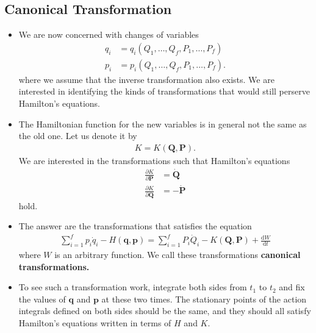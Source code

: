 \documentclass[10pt]{article}
\newcommand{\dee}{\mathrm{d}}
\newcommand{\ve}[1]{\mathbf{#1}}
\begin{document}
  \subsection{Canonical Transformation}

  \begin{itemize}
    \item We are now concerned with changes of variables
    \begin{align*}
      q_i &= q_i(Q_1, \dotsc, Q_f, P_1, \dotsc, P_f) \\
      p_i &= p_i(Q_1, \dotsc, Q_f, P_1, \dotsc, P_f).
    \end{align*}
    where we assume that the inverse transformation also exists. We are interested in identifying the kinds of transformations that would still perserve Hamilton's equations.

    \item The Hamiltonian function for the new variables is in general not the same as the old one. Let us denote it by
    \begin{align*}
      K = K(\ve{Q}, \ve{P}).
    \end{align*}
    We are interested in the transformations such that Hamilton's equations
    \begin{align*}
      \frac{\partial K}{\partial \ve{P}} &= \dot{\ve{Q}} \\
      \frac{\partial K}{\partial \ve{Q}} &= -\dot{\ve{P}}
    \end{align*}
    hold.

    \item The answer are the transformations that satisfies the equation
    \begin{align*}
      \sum_{i=1}^f p_i \dot{q}_i - H(\ve{q},\ve{p}) = \sum_{i=1}^f P_i \dot{Q}_i - K(\ve{Q}, \ve{P}) + \frac{\dee W}{\dee t}
    \end{align*}
    where $W$ is an arbitrary function. We call these transformations {\bf canonical transformations.}

    \item To see such a transformation work, integrate both sides from $t_1$ to $t_2$ and fix the values of $\ve{q}$ and $\ve{p}$ at these two times. The stationary points of the action integrals defined on both sides should be the same, and they should all satisfy Hamilton's equations written in terms of $H$ and $K$.


\end{itemize}
\end{document}

